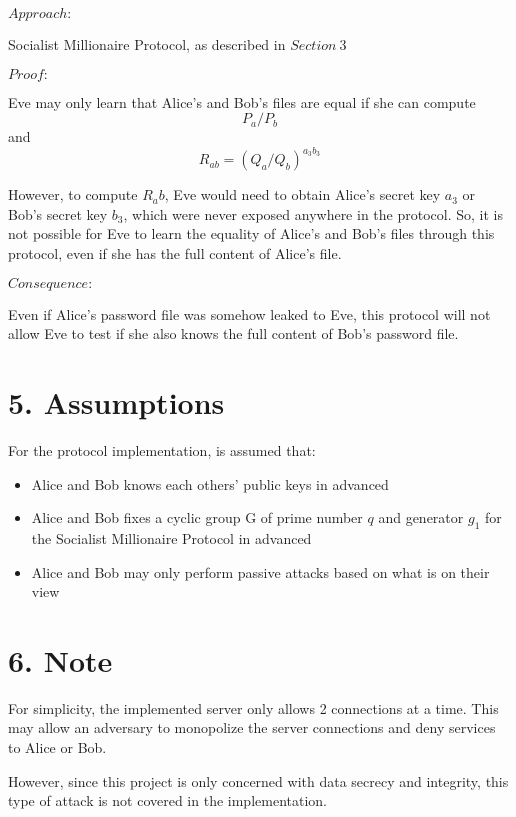 \documentclass{article}
\begin{document}
$Approach:$ 

Socialist Millionaire Protocol, as described in $Section\ 3$

$Proof:$

Eve may only learn that Alice's and Bob's files are equal if she can compute 
$$P_a / P_b$$ and $$R_{ab} = (Q_a/Q_b)^{a_3b_3}$$

However, to compute $R_ab$, Eve would need to obtain Alice's secret key $a_3$
or Bob's secret key $b_3$, which were never exposed anywhere in the protocol.
So, it is not possible for Eve to learn the equality of Alice's and Bob's files 
through this protocol, even if she has the full content of Alice's file.

$Consequence:$ 

Even if Alice's password file was somehow leaked to Eve, this protocol will not allow 
Eve to test if she also knows the full content of Bob's password file.

\section*{5. Assumptions}

For the protocol implementation, is assumed that:

\begin{itemize}
  \item Alice and Bob knows each others' public keys in advanced
  \item Alice and Bob fixes a cyclic group G of prime number $q$ and generator $g_1$ 
  for the Socialist Millionaire Protocol in advanced
  \item Alice and Bob may only perform passive attacks based on what is on their view
\end{itemize}

\section*{6. Note}

For simplicity, the implemented server only allows 2 connections at a time. 
This may allow an adversary to monopolize the server connections and deny 
services to Alice or Bob. 

However, 
since this project is only concerned with data secrecy and 
integrity, this type of attack is not covered in the implementation.
\end{document}
